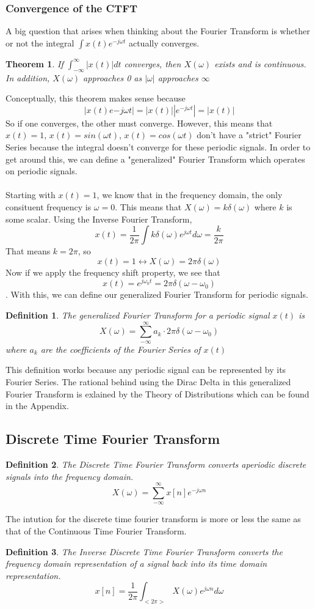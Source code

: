 \documentclass{article}
\newtheorem{theorem}{Theorem}
\newtheorem{definition}{Definition}
\begin{document}
\subsubsection{Convergence of the CTFT}
A big question that arises when thinking about the Fourier Transform is whether or not the integral $\int{x(t)e^{-j\omega t}}$
actually converges.
\begin{theorem}
    If $\int_{-\infty}^{\infty}{|x(t)|dt}$ converges, then $X(\omega)$ exists and is continuous.
    In addition, $X(\omega)$ approaches 0 as $|\omega|$ approaches $\infty$
\end{theorem}
Conceptually, this theorem makes sense because
$$|x(t)e{-j\omega t}| = |x(t)| |e^{-j\omega t}| = |x(t)|$$
So if one converges, the other must converge. However, this means that $x(t)=1$, $x(t)=sin(\omega t)$, $x(t)=cos(\omega t)$
don't have a "strict" Fourier Series because the integral doesn't converge for these periodic signals. In order to get around this,
we can define a "generalized" Fourier Transform which operates on periodic signals.\\\\
Starting with $x(t)=1$, we know that in the frequency domain, the only consituent frequency is $\omega=0$.
This means that $X(\omega) = k\delta(\omega)$ where $k$ is some scalar.
Using the Inverse Fourier Transform,
$$x(t) = \frac{1}{2\pi}\int{k\delta(\omega)e^{j\omega t}d\omega} = \frac{k}{2\pi}$$
That means $k = 2\pi$, so
$$x(t) = 1 \leftrightarrow X(\omega) = 2\pi \delta(\omega)$$
Now if we apply the frequency shift property, we see that
$$x(t) = e^{j\omega_0 t} = 2\pi \delta(\omega - \omega_0)$$.
With this, we can define our generalized Fourier Transform for periodic signals.
\begin{definition}
    The generalized Fourier Transform for a periodic signal $x(t)$ is
    $$X(\omega) = \sum_{-\infty}^{\infty}{a_k\cdot 2\pi \delta(\omega - \omega_0)}$$
    where $a_k$ are the coefficients of the Fourier Series of $x(t)$
\end{definition}
This definition works because any periodic signal can be represented by its Fourier Series.
The rational behind using the Dirac Delta in this generalized Fourier Transform is exlained by the 
Theory of Distributions which can be found in the Appendix. %
\subsection{Discrete Time Fourier Transform}
\begin{definition}
    The Discrete Time Fourier Transform converts aperiodic discrete signals into the frequency domain.
    $$X(\omega) = \sum_{-\infty}^{\infty}{x[n]e^{-j\omega n}}$$
\end{definition}
The intution for the discrete time fourier transform is more or less the same as that of the Continuous Time Fourier Transform.
\begin{definition}
    The Inverse Discrete Time Fourier Transform converts the frequency domain representation of a signal
    back into its time domain representation.
    $$x[n] = \frac{1}{2\pi}\int_{<2\pi>}{X(\omega)e^{j\omega n}d\omega}$$
\end{definition}
\end{document}
